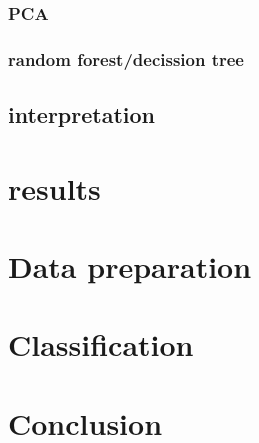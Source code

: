\subsection{PCA}
\subsection{random forest/decission tree}
\section{interpretation}

\chapter{results}
%



\chapter{Data preparation}
\chapter{Classification}
\chapter*{Conclusion}